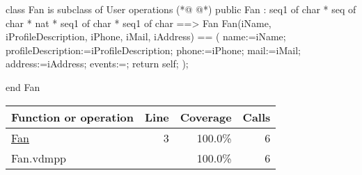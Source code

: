 \begin{vdmpp}[breaklines=true]
class Fan is subclass of User 
operations
(*@
\label{Fan:3}
@*)
public  Fan : seq1 of char * seq of char * nat * seq1 of char * seq1 of char  ==> Fan
  Fan(iName, iProfileDescription, iPhone, iMail, iAddress) == (
   name:=iName;
   profileDescription:=iProfileDescription;
   phone:=iPhone;
   mail:=iMail;
   address:=iAddress;
   events:={};
   return self;
  );

end Fan
\end{vdmpp}
\bigskip
\begin{longtable}{|l|r|r|r|}
\hline
Function or operation & Line & Coverage & Calls \\
\hline
\hline
\hyperref[Fan:3]{Fan} & 3&100.0\% & 6 \\
\hline
\hline
Fan.vdmpp & & 100.0\% & 6 \\
\hline
\end{longtable}

